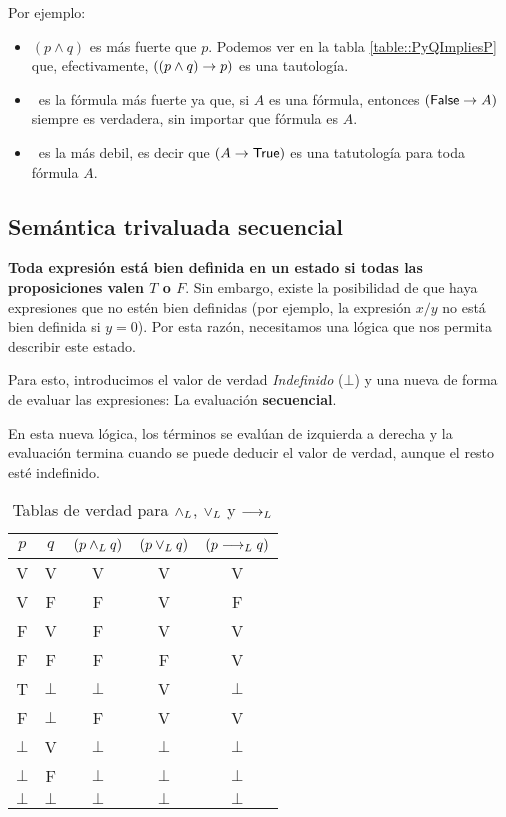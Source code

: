 Por ejemplo:
\begin{itemize}
	\item $(p\land q)$ es más fuerte que $p$. Podemos ver en la tabla \ref{table::PyQImpliesP} que, efectivamente, $((p\land q)\rightarrow p)$ es una tautología.
	\item \False~es la fórmula más fuerte ya que, si $A$ es una fórmula, entonces $(\mathsf{False}\rightarrow A)$ siempre es verdadera, sin importar que fórmula es $A$.
	\item \True~es la más debil, es decir que $(A\rightarrow\mathsf{True})$ es una tatutología para toda fórmula $A$.
\end{itemize}
\subsection{Semántica  trivaluada secuencial}

\textbf{Toda expresión está bien definida en un estado si todas las proposiciones valen $T$ o $F$}. Sin embargo, existe la posibilidad de que haya expresiones que no estén bien definidas (por ejemplo, la expresión $x/y$ no está bien definida si $y = 0$). Por esta razón, necesitamos una lógica que nos permita describir este estado.

Para esto, introducimos el valor de verdad \textit{Indefinido} ($\bot$) y una nueva de forma de evaluar las expresiones: La evaluación \textbf{secuencial}.

En esta nueva lógica, los términos se evalúan de izquierda a derecha y la evaluación termina cuando se puede deducir el valor de verdad, aunque el resto esté indefinido.

\begin{table}[h]
	\begin{center}
		\begin{tabular}{c|c|c|c|c}
			$p$ & $q$ & $(p \land _L q)$ & $(p \lor _L q)$ & $(p\longrightarrow _L q)$\\
			\hline
			V & V & V & V & V \\
			V & F & F & V & F \\
			F & V & F & V & V \\
			F & F & F & F & V \\
			T & $\bot$ & $\bot$ & V & $\bot$ \\
			F & $\bot$ & F & V & V\\
			$\bot$ & V & $\bot$ & $\bot$ & $\bot$ \\
			$\bot$ & F & $\bot$ & $\bot$ & $\bot$ \\
			$\bot$ & $\bot$ & $\bot$ & $\bot$ & $\bot$ \\
		\end{tabular}
	\end{center}
	\caption{Tablas de verdad para $\land _L$, $\lor _L$ y $\longrightarrow _L$} 
\end{table}


